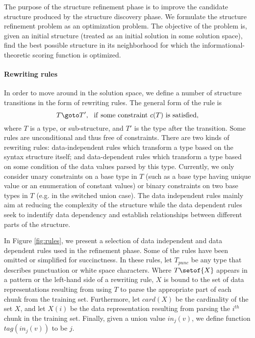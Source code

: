 The purpose of the structure refinement phase is to improve
the candidate structure produced by the structure discovery phase. We
formulate the structure refinement problem as an optimization problem. The
objective of the problem is, given an initial structure (treated as
an initial solution in some solution space), find the best possible structure
in its neighborhood for which the informational-theoretic scoring function
is optimized.

\paragraph*{Rewriting rules}
In order to move around in the solution space, we define a number of structure
transitions in the form of rewriting rules. The general form of the rule is
\[T \goto T', ~~ {\rm if~ some~ constraint~} c(T)~ {\rm is~ satisfied,}\]
where $T$ is a type, or sub-structure, and $T'$ is the type after the
transition.  Some rules are unconditional and thus free of constraints.
There are two kinds of rewriting rules: data-independent rules which
transform a type based on the syntax structure itself; and data-dependent
rules which transform a type based on some condition of the data values
parsed by this type. Currently, we only consider unary constraints on a base
type in $T$ (such as a base type having unique value or an enumeration of constant
values) or binary constraints on two base types in $T$ (e.g. in the switched
union case). The data independent rules mainly aim at reducing the complexity
of the structure while the data dependent rules seek to indentify data
dependency and establish relationships between different parts 
of the structure.

In Figure \ref{fig:rules}, we present a selection of
data independent and data dependent rules used in the refinement phase.
Some of the rules have been omitted or simplified for succinctness.
In these rules,
let $T_{punc}$ be any type that describes punctuation or white space characters.
Where $T\setof{X}$ appears in a pattern or the left-hand side of a rewriting
rule, $X$ is bound to the set of data representations resulting
from using $T$ to parse the appropriate part of each chunk from the training
set. Furthermore, let $card(X)$ be the cardinality of the set $X$, 
and let $X(i)$ be the data representation resulting
from parsing the $i^{th}$ chunk in the training set. Finally, given a union
value $in_j(v)$, we define function $tag(in_j(v))$ to be $j$.

